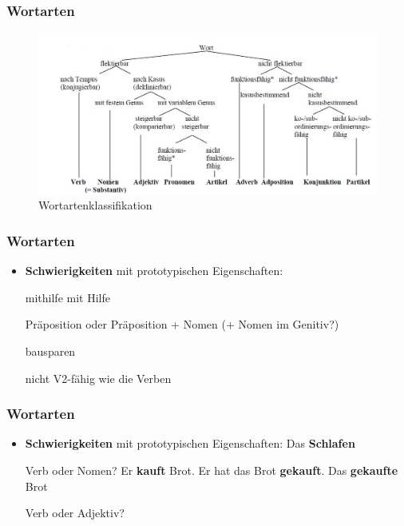 \begin{frame}
\frametitle{Wortarten}

\begin{figure}
\centering
	\includegraphics[scale=.4]{material/07wortartenklassifikation}
	\caption{Wortartenklassifikation \citep{Repp&Co15a}}
\end{figure}

\end{frame}


\begin{frame}
\frametitle{Wortarten}
\begin{itemize}
	\item \textbf{Schwierigkeiten} mit prototypischen Eigenschaften:

	\eal 
	\ex mithilfe 
	\ex mit Hilfe
	\zl
	
\pause 
Präposition oder Präposition + Nomen (+ Nomen im Genitiv?)
\pause

	\ea bausparen 
	\z

\pause	
	nicht V2-fähig wie die  Verben

\end{itemize}

\end{frame}


\begin{frame}
\frametitle{Wortarten}

	\begin{itemize}
			\item \textbf{Schwierigkeiten} mit prototypischen Eigenschaften:
				\ea Das \textbf{Schlafen}
			\z
			
			\pause
			Verb oder Nomen?
				\eal
			\ex Er \textbf{kauft} Brot. 
			\ex Er hat das Brot \textbf{gekauft}.
			\pause
			\ex Das \textbf{gekaufte} Brot
			\zl
			
			\pause
			Verb oder Adjektiv?
	\end{itemize}
\end{frame}


